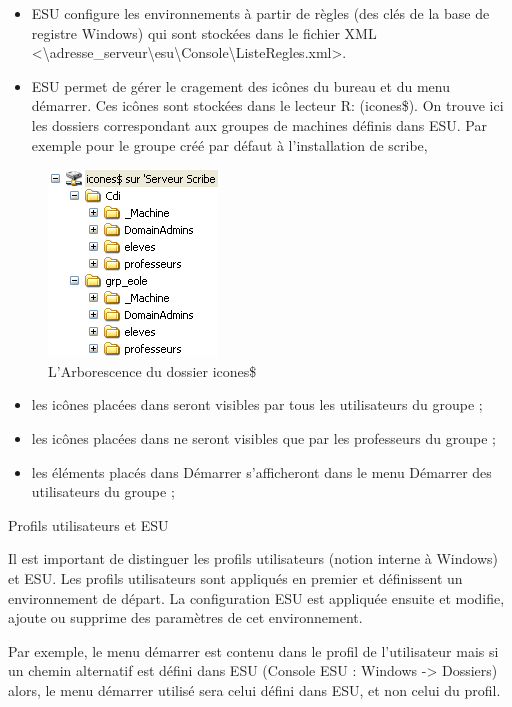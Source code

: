 \documentclass{article}
\makeatletter
\def\maxwidth{\ifdim\Gin@nat@width>\linewidth\linewidth
\else\Gin@nat@width\fi}
\let\Oldincludegraphics\includegraphics
\renewcommand{\includegraphics}[1]{\Oldincludegraphics[width=\maxwidth]{#1}}
\makeatother
\begin{document}
\begin{itemize}
\item
  ESU configure les environnements à partir de règles (des clés de la
  base de registre Windows) qui sont stockées dans le fichier XML
  \textless{}\textbackslash{}adresse\_serveur\textbackslash{}esu\textbackslash{}Console\textbackslash{}ListeRegles.xml\textgreater{}.
\item
  ESU permet de gérer le cragement des icônes du bureau et du menu
  démarrer. Ces icônes sont stockées dans le lecteur R: (icones\$). On
  trouve ici les dossiers correspondant aux groupes de machines définis
  dans ESU. Par exemple pour le groupe créé par défaut à l'installation
  de scribe,
\end{itemize}
\begin{figure}[htbp]
\centering
\includegraphics{scribe_html_6d99f570.png}
\caption{L'Arborescence du dossier icones\$}
\end{figure}

\begin{itemize}
\item
  les icônes placées dans seront visibles par tous les utilisateurs du
  groupe ;
\item
  les icônes placées dans ne seront visibles que par les professeurs du
  groupe ;
\item
  les éléments placés dans Démarrer s'afficheront dans le menu Démarrer
  des utilisateurs du groupe ;
\end{itemize}
Profils utilisateurs et ESU

Il est important de distinguer les profils utilisateurs (notion interne
à Windows) et ESU. Les profils utilisateurs sont appliqués en premier et
définissent un environnement de départ. La configuration ESU est
appliquée ensuite et modifie, ajoute ou supprime des paramètres de cet
environnement.

Par exemple, le menu démarrer est contenu dans le profil de
l'utilisateur mais si un chemin alternatif est défini dans ESU (Console
ESU : Windows -\textgreater{} Dossiers) alors, le menu démarrer utilisé
sera celui défini dans ESU, et non celui du profil.
\end{document}
